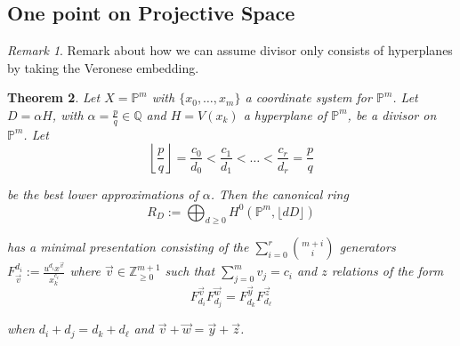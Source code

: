 \documentclass{amsart}
\theoremstyle{plain}
\newtheorem{thm}{Theorem}[section]
\theoremstyle{definition}
\theoremstyle{remark}
\newtheorem{rem}[thm]{Remark}
\numberwithin{equation}{section}
\newcommand\ssec{\subsection}
\newcommand\bq{{\mathbb Q}}
\newcommand\bp{{\mathbb P}}
\newcommand\bz{{\mathbb Z}}
\begin{document}


\ssec{One point on Projective Space}
\label{ssec:proj-one-point}

\begin{rem}
Remark about how we can assume divisor only consists of hyperplanes
by taking the Veronese embedding.
\end{rem}


\begin{thm}
\label{thm:proj-one-point}
Let $X = \bp^m$ with $\{x_0, \ldots, x_m\}$ a coordinate system for
$\bp^m$. Let $D = \alpha H$, with $\alpha = \frac{p}{q} \in \bq$
and $H = V(x_k)$ a hyperplane of $\bp^m$, be a divisor on $\bp^m$.
Let
\[
	\left\lfloor \frac{p}{q} \right\rfloor = \frac{c_0}{d_0} <
	\frac{c_1}{d_1} < \ldots < \frac{c_r}{d_r} = \frac{p}{q}
\]

\noindent
be the best lower approximations of $\alpha$. Then the
canonical ring
\[
	R_D := \bigoplus_{d \geq 0} H^0(\bp^m, \lfloor dD \rfloor)
\]

\noindent
has a minimal presentation consisting of the $\sum_{i = 0}^{r}
{{m + i} \choose {i}}$ generators $F_{\vec{v}}^{d_i} := \frac{u^{d_i}
x^{\vec{v}}}{x_k^{c_i}}$ where $\vec{v} \in \bz_{\geq 0}^{m + 1}$
such that $\sum_{j = 0}^{m} v_j = c_i$ and $z$ 
relations of the form
\[
	F_{d_i}^{\vec{v}} F_{d_j}^{\vec{w}} = F_{d_k}^{\vec{y}} F_{d_\ell}^{\vec{z}}
\]

\noindent
when $d_i + d_j = d_k + d_\ell$ and $\vec{v} + \vec{w} = \vec{y} +
\vec{z}$.
\end{thm}
\end{document}
